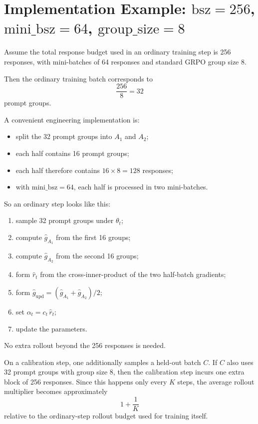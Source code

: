 \documentclass[11pt,a4paper]{article}
\newcommand{\ghat}{\hat g}
\newcommand{\rhat}{\hat r_t}
\begin{document}
\section{Implementation Example: $\mathrm{bsz}=256$, $\mathrm{mini\_bsz}=64$, $\mathrm{group\_size}=8$}
Assume the total response budget used in an ordinary training step is 256 responses, with mini-batches of 64 responses and standard GRPO group size 8.

Then the ordinary training batch corresponds to
\begin{equation}
\frac{256}{8} = 32
\end{equation}
prompt groups.

A convenient engineering implementation is:
\begin{itemize}[leftmargin=2em]
    \item split the 32 prompt groups into $A_1$ and $A_2$;
    \item each half contains 16 prompt groups;
    \item each half therefore contains $16 \times 8 = 128$ responses;
    \item with $\mathrm{mini\_bsz}=64$, each half is processed in two mini-batches.
\end{itemize}
So an ordinary step looks like this:
\begin{enumerate}[label=\arabic*., leftmargin=2em]
    \item sample 32 prompt groups under $\theta_t$;
    \item compute $\ghat_{A_1}$ from the first 16 groups;
    \item compute $\ghat_{A_2}$ from the second 16 groups;
    \item form $\rhat$ from the cross-inner-product of the two half-batch gradients;
    \item form $\ghat_{\mathrm{upd}} = (\ghat_{A_1}+\ghat_{A_2})/2$;
    \item set $\alpha_t = c_t\,\rhat$;
    \item update the parameters.
\end{enumerate}
No extra rollout beyond the 256 responses is needed.

On a calibration step, one additionally samples a held-out batch $C$. If $C$ also uses 32 prompt groups with group size 8, then the calibration step incurs one extra block of 256 responses. Since this happens only every $K$ steps, the average rollout multiplier becomes approximately
\begin{equation}
1 + \frac{1}{K}
\end{equation}
relative to the ordinary-step rollout budget used for training itself.
\end{document}
